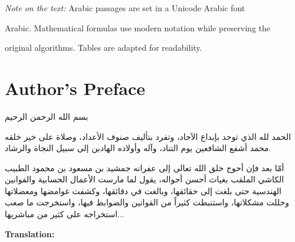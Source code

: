 \documentclass[11pt,a4paper]{article}
\newenvironment{arabicbox}{%

  \begin{framed}

  \begin{minipage}{\linewidth-2\fboxsep-2\fboxrule}

  \setlength{\parindent}{0pt}

  \linespread{1.3}\selectfont

}{%

  \end{minipage}

  \end{framed}

}
\begin{document}
\vspace{0.5cm}

\noindent\textit{Note on the text:} Arabic passages are set in a Unicode Arabic font

Arabic. Mathematical formulas use modern notation while preserving the

original algorithms. Tables are adapted for readability.

\clearpage






\section*{Author's Preface}




\begin{arabicbox}

\begin{Arabic}

بسم الله الرحمن الرحيم



الحمد لله الذي توحد بإبداع الآحاد، وتفرد بتأليف صنوف الأعداد، وصلاة على خير خلقه محمد أشفع الشافعين يوم التناد، وآله وأولاده الهادين إلى سبيل النجاة والرشاد.



أمّا بعد فإن أحوج خلق الله تعالى إلى عفرانه جمشيد بن مسعود بن محمود الطبيب الكاشي الملقب بغياث أحسن أحواله، يقول لما مارست الأعمال الحسابية والقوانين الهندسية حتى بلغت إلى حقائقها، وبالغت في دقائقها، وكشفت غوامضها ومعضلاتها وحللت مشكلاتها، واستنبطت كثيراً من القوانين والضوابط فيها، واستخرجت ما صعب استخراجه على كثير من مباشريها...

\end{Arabic}

\end{arabicbox}



\vspace{0.5cm}

\noindent\textbf{Translation:}
\end{document}
